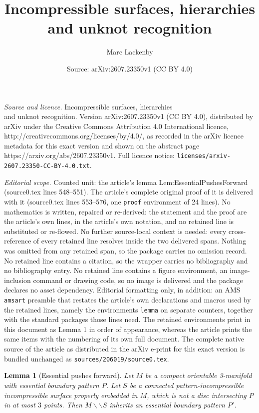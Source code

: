 \documentclass[10pt,a4paper]{amsart}
\title{Incompressible surfaces, hierarchies \\ and unknot recognition}
\author{Marc Lackenby}
\date{Source: arXiv:2607.23350v1 (CC BY 4.0)}
\newtheorem{lemma}{Lemma}
\newcommand{\cut}{\backslash\backslash}
\begin{document}
\maketitle

\noindent\emph{Source and licence.} Incompressible surfaces, hierarchies \\ and unknot recognition. Version arXiv:2607.23350v1 (CC BY 4.0), distributed by arXiv under the Creative Commons Attribution 4.0 International licence, http://creativecommons.org/licenses/by/4.0/, as recorded in the arXiv licence metadata for this exact version and shown on the abstract page https://arxiv.org/abs/2607.23350v1. Full licence notice: \texttt{licenses/arxiv-2607.23350-CC-BY-4.0.txt}.\par\smallskip

\noindent\textit{Editorial scope.} Counted unit: the article's lemma Lem:EssentialPushesForward (source0.tex lines 548--551). The article's complete original proof of it is delivered with it (source0.tex lines 553--576, one \texttt{proof} environment of 24 lines). No mathematics is written, repaired or re-derived: the statement and the proof are the article's own lines, in the article's own notation, and no retained line is substituted or re-flowed.  No further source-local context is needed: every cross-reference of every retained line resolves inside the two delivered spans.  Nothing was omitted from any retained span, so the package carries no omission record.  No retained line contains a citation, so the wrapper carries no bibliography and no bibliography entry.  No retained line contains a figure environment, an image-inclusion command or drawing code, so no image is delivered and the package declares no asset dependency.  Editorial formatting only, in addition: an AMS \texttt{amsart} preamble that restates the article's own declarations and macros used by the retained lines, namely the environments \texttt{lemma} on separate counters, together with the standard packages those lines need.  The retained environments print in this document as Lemma 1 in order of appearance, whereas the article prints the same items with the numbering of its own full document.  The complete native source of the article as distributed in the arXiv e-print for this exact version is bundled unchanged as \texttt{sources/206019/source0.tex}.
\begin{lemma}[Essential pushes forward]
\label{Lem:EssentialPushesForward}
Let $M$ be a compact orientable 3-manifold with essential boundary pattern $P$. Let $S$ be a connected pattern-incompressible incompressible surface properly embedded in $M$, which is not a disc intersecting $P$ in at most $3$ points. Then $M \cut S$ inherits an essential boundary pattern $P'$.
\end{lemma}
\end{document}
